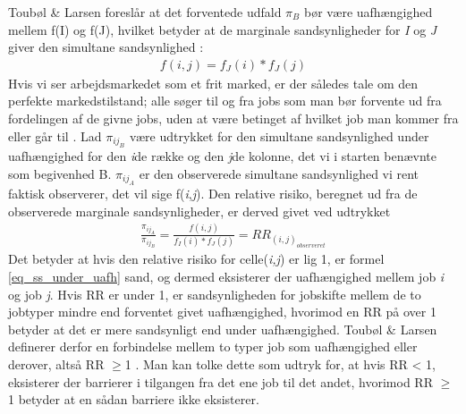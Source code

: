 Toubøl \& Larsen foreslår at det forventede udfald $\pi_{B}$ bør være uafhængighed mellem f(I) og f(J), hvilket betyder at de marginale sandsynligheder for \emph{I} og \emph{J} giver den simultane sandsynlighed \parencite[44]{Malchow-Moeller2003}:
%
\begin{align} \label{eq_ss_under_uafh} 
f(i,j) = f_{J}(i)*f_{J}(j)
\end{align} 
%
Hvis vi ser arbejdsmarkedet som et frit marked, er der således tale om den perfekte markedstilstand; alle søger til og fra jobs som man bør forvente ud fra fordelingen af de givne jobs, uden at være betinget af hvilket job man kommer fra eller går til \parencite[43]{Malchow-Moeller2003}. Lad $\pi_{ij_{B}}$ være udtrykket for den simultane sandsynlighed under uafhængighed for den \emph{i}de række og den \emph{j}de kolonne, det vi i starten benævnte som begivenhed B. $\pi_{ij_{A}}$ er den observerede simultane sandsynlighed vi rent faktisk observerer, det vil sige f(\emph{i},\emph{j}). Den relative risiko, beregnet ud fra de observerede marginale sandsynligheder, er derved givet ved udtrykket   
%
\begin{align} \label{eq_RR_observeret1}
\frac{\pi_{ij_{A}}}{\pi_{ij_{B}}} = \frac{f(i,j)}{f_{I}(i)*f_{J}(j)} = RR_{(i,j)_{observeret}}
\end{align} 
%
Det betyder at hvis den relative risiko for celle(\emph{i,j}) er lig 1, er formel \ref{eq_ss_under_uafh} sand, og dermed eksisterer der uafhængighed mellem job \emph{i} og job \emph{j}. Hvis RR er under 1, er sandsynligheden for jobskifte mellem de to jobtyper mindre end forventet givet uafhængighed, hvorimod en RR på over 1 betyder at det er mere sandsynligt end under uafhængighed. Toubøl \& Larsen definerer derfor en forbindelse mellem to typer job som uafhængighed eller derover, altså RR $\geq$1 \parencite[9]{Touboel2013}. Man kan tolke dette som udtryk for, at hvis RR < 1, eksisterer der barrierer i tilgangen fra det ene job til det andet, hvorimod RR $\geq$1 betyder at en sådan barriere ikke eksisterer.

